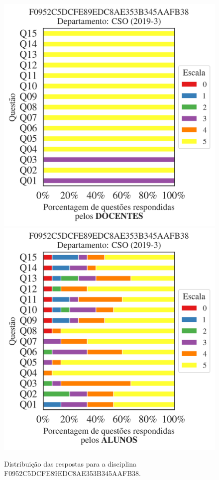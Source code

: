 \documentclass[a4paper,10pt]{article}
\begin{document}
\begin{figure}[h]
\centering
\includegraphics[width=0.485\linewidth]{analise_disciplina_departamento_CSO_F0952C5DCFE89EDC8AE353B345AAFB38_docentes.png}
\includegraphics[width=0.485\linewidth]{analise_disciplina_departamento_CSO_F0952C5DCFE89EDC8AE353B345AAFB38_alunos.png}
\caption{\label{fig:analise_geral_departamento}                Distribuição das respostas para a disciplina F0952C5DCFE89EDC8AE353B345AAFB38. }
\end{figure}
\end{document}
